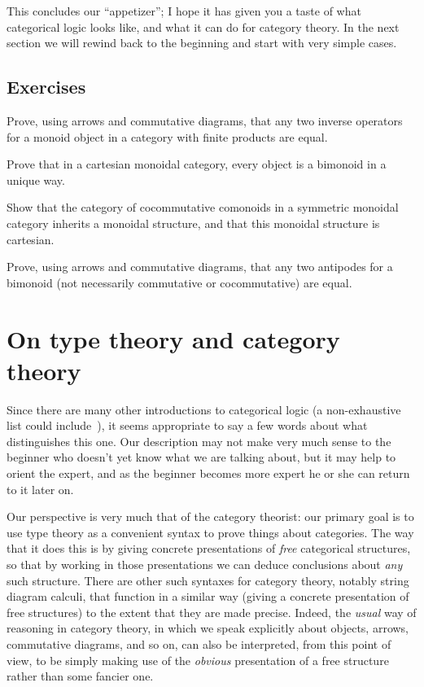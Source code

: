 \documentclass{book}
\begin{document}
This concludes our ``appetizer''; I hope it has given you a taste of what categorical logic looks like, and what it can do for category theory.
In the next section we will rewind back to the beginning and start with very simple cases.

\subsection*{Exercises}

\begin{ex}\label{ex:fp-inv-uniq}
  Prove, using arrows and commutative diagrams, that any two inverse operators for a monoid object in a category with finite products are equal.
\end{ex}

\begin{ex}\label{ex:cartmon-bimon-uniq}
  Prove that in a cartesian monoidal category, every object is a bimonoid in a unique way.
\end{ex}

\begin{ex}\label{ex:ccmon-cart}
  Show that the category of cocommutative comonoids in a symmetric monoidal category inherits a monoidal structure, and that this monoidal structure is cartesian.
\end{ex}

\begin{ex}\label{ex:antipode}
  Prove, using arrows and commutative diagrams, that any two antipodes for a bimonoid (not necessarily commutative or cocommutative) are equal.
\end{ex}


\section{On type theory and category theory}
\label{sec:generalities}

Since there are many other introductions to categorical logic (a non-exhaustive list could include~\cite{mr:focl,ls:hocl,jacobs:cltt,goldblatt:topoi,ptj:elephant}), it seems appropriate to say a few words about what distinguishes this one.
Our description may not make very much sense to the beginner who doesn't yet know what we are talking about, but it may help to orient the expert, and as the beginner becomes more expert he or she can return to it later on.

Our perspective is very much that of the category theorist: our primary goal is to use type theory as a convenient syntax to prove things about categories.
The way that it does this is by giving concrete presentations of \emph{free} categorical structures, so that by working in those presentations we can deduce conclusions about \emph{any} such structure.
There are other such syntaxes for category theory, notably string diagram calculi, that function in a similar way (giving a concrete presentation of free structures) to the extent that they are made precise.
Indeed, the \emph{usual} way of reasoning in category theory, in which we speak explicitly about objects, arrows, commutative diagrams, and so on, can also be interpreted, from this point of view, to be simply making use of the \emph{obvious} presentation of a free structure rather than some fancier one.
\end{document}
